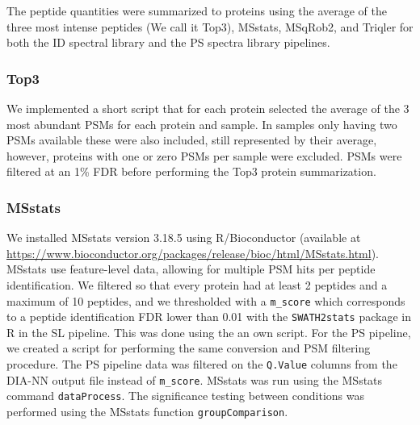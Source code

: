 \documentclass[10pt,letterpaper]{article}
\begin{document}
The peptide quantities were summarized to proteins using the average of the three most intense peptides (We call it Top3), MSstats, MSqRob2, and Triqler for both the ID spectral library and the PS spectra library pipelines. 

\subsubsection*{Top3}

We implemented a short script that for each protein selected the average of the 3 most abundant PSMs for each protein and sample. In samples only having two PSMs available these were also included, still represented by their average, however, proteins with one or zero PSMs per sample were excluded. PSMs were filtered at an 1\% FDR before performing the Top3 protein summarization. 

\subsubsection*{MSstats}

We installed MSstats version 3.18.5 using R/Bioconductor (available at \url{https://www.bioconductor.org/packages/release/bioc/html/MSstats.html}). MSstats use feature-level data, allowing for multiple PSM hits per peptide identification. We filtered so that every protein had at least 2 peptides and a maximum of 10 peptides, and we thresholded with a \texttt{m\_score} which corresponds to a peptide identification FDR lower than 0.01 with the \texttt{SWATH2stats} package in R in the SL pipeline. This was done using the an own script. For the PS pipeline, we created a script for performing the same conversion and PSM filtering procedure. The PS pipeline data was filtered on the \texttt{Q.Value} columns from the DIA-NN output file instead of \texttt{m\_score}. MSstats was run using the MSstats command \texttt{dataProcess}. The significance testing between conditions was performed using the MSstats function \texttt{groupComparison}.  
\end{document}
